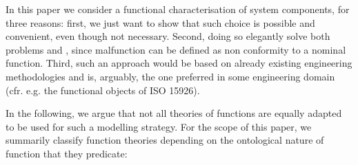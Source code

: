 \documentclass[
]{ceurart}
\begin{document}
In this paper we consider a functional characterisation of system components, for three reasons: first, we just want to show that such choice is possible and convenient, even though not necessary. Second, doing so elegantly solve both problems  and , since malfunction can be defined as non conformity to a nominal function. Third, such an approach would be based on already existing engineering methodologies and is, arguably, the one preferred in some engineering domain (cfr. e.g. the functional objects of ISO 15926).

In the following, we argue that not all theories of functions are equally adapted to be used for such a modelling strategy. 
For the scope of this paper, we summarily classify function theories depending on the ontological nature of function that they predicate:
\end{document}
